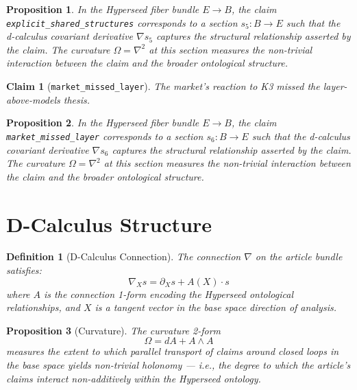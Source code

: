 \documentclass{article}
\newtheorem{claim}{Claim}
\newtheorem{definition}{Definition}
\newtheorem{proposition}{Proposition}
\begin{document}
\begin{proposition}
In the Hyperseed fiber bundle $E \to B$, the claim \texttt{explicit_shared_structures} corresponds to a section $s_5: B \to E$ such that the d-calculus covariant derivative $\nabla s_5$ captures the structural relationship asserted by the claim. The curvature $\Omega = \nabla^2$ at this section measures the non-trivial interaction between the claim and the broader ontological structure.
\end{proposition}

\begin{claim}[\texttt{market_missed_layer}]
The market's reaction to K3 missed the layer-above-models thesis.
\end{claim}

\begin{proposition}
In the Hyperseed fiber bundle $E \to B$, the claim \texttt{market_missed_layer} corresponds to a section $s_6: B \to E$ such that the d-calculus covariant derivative $\nabla s_6$ captures the structural relationship asserted by the claim. The curvature $\Omega = \nabla^2$ at this section measures the non-trivial interaction between the claim and the broader ontological structure.
\end{proposition}

\section{D-Calculus Structure}

\begin{definition}[D-Calculus Connection]
The connection $\nabla$ on the article bundle satisfies:
\begin{equation}
  \nabla_X s = \partial_X s + A(X) \cdot s
\end{equation}
where $A$ is the connection 1-form encoding the Hyperseed ontological relationships, and $X$ is a tangent vector in the base space direction of analysis.
\end{definition}

\begin{proposition}[Curvature]
The curvature 2-form
\begin{equation}
  \Omega = dA + A \wedge A
\end{equation}
measures the extent to which parallel transport of claims around closed loops in the base space yields non-trivial holonomy --- i.e., the degree to which the article's claims interact non-additively within the Hyperseed ontology.
\end{proposition}
\end{document}
